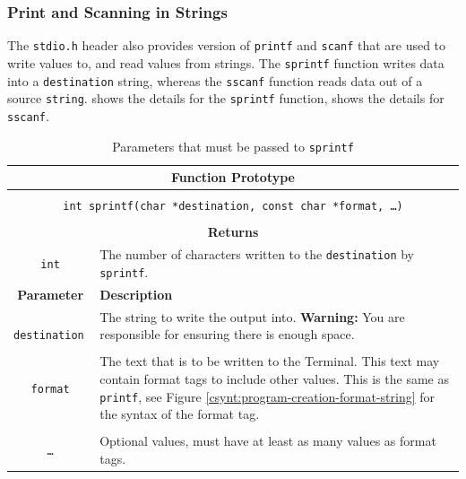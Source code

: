 \subsubsection{Print and Scanning in Strings} %
\label{ssub:print_and_scanning_in_strings}

The \texttt{stdio.h} header also provides version of \texttt{printf} and \texttt{scanf} that are used to write values to, and read values from strings. The \texttt{sprintf} function writes data into a \texttt{destination} string, whereas the \texttt{sscanf} function reads data out of a source \texttt{string}.  shows the details for the \texttt{sprintf} function,  shows the details for \texttt{sscanf}.

\begin{table}[h]
  \centering
  \begin{tabular}{|c|p{9cm}|}
    \hline
    \multicolumn{2}{|c|}{\textbf{Function Prototype}} \\
    \hline
    \multicolumn{2}{|c|}{} \\
    \multicolumn{2}{|c|}{\texttt{int sprintf(char *destination, const char *format, \ldots )}} \\
    \multicolumn{2}{|c|}{} \\
    \hline
    \multicolumn{2}{|c|}{\textbf{Returns}} \\
    \hline
    \texttt{int} & The number of characters written to the \texttt{destination} by \texttt{sprintf}. \\
    \hline
    \textbf{Parameter} & \textbf{Description} \\
    \hline
    \texttt{ destination } & The string to write the output into. \textbf{Warning:} You are responsible for ensuring there is enough space.\\
    & \\
    \texttt{ format } & The text that is to be written to the Terminal. This text may contain format tags to include other values. This is the same as \texttt{printf}, see Figure \ref{csynt:program-creation-format-string} for the syntax of the format tag. \\
    & \\
    \texttt{\ldots}   & Optional values, must have at least as many values as format tags. \\
    \hline
  \end{tabular}
  \caption{Parameters that must be passed to \texttt{sprintf}}
  \label{tbl:sprintf}
\end{table}


